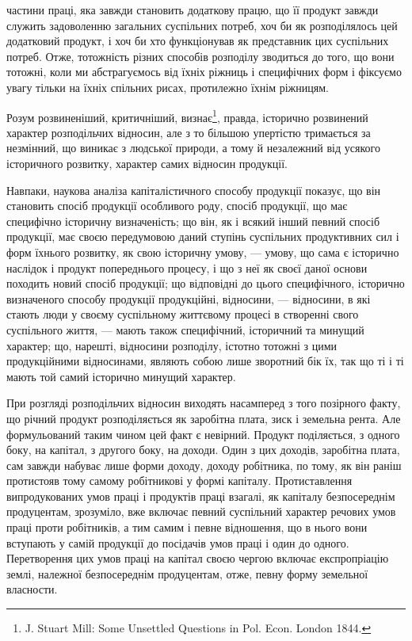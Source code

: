 \parcont{}  %
частини праці, яка завжди становить додаткову працю, що її продукт завжди
служить задоволенню загальних суспільних потреб, хоч би як розподілялось
цей додатковий продукт, і хоч би хто функціонував як представник цих суспільних
потреб. Отже, тотожність різних способів розподілу зводиться до того,
що вони тотожні, коли ми абстрагуємось від їхніх ріжниць і специфічних форм
і фіксуємо увагу тільки на їхніх спільних рисах, протилежно їхнім ріжницям.

Розум розвиненіший, критичніший, визнає\footnote{
J. Stuart Mill: Some Unsettled Questions in Pol. Econ. London 1844.
}, правда, історично розвинений
характер розподільчих відносин, але з то більшою упертістю тримається за незмінний,
що виникає з людської природи, а тому й незалежний від усякого історичного
розвитку, характер самих відносин продукції.

Навпаки, наукова аналіза капіталістичного способу продукції показує, що
він становить спосіб продукції особливого роду, спосіб продукції, що має специфічно
історичну визначеність; що він, як і всякий інший певний спосіб продукції,
має своєю передумовою даний ступінь суспільних продуктивних сил і
форм їхнього розвитку, як свою історичну умову, — умову, що сама є історично
наслідок і продукт попереднього процесу, і що з неї як своєї даної основи
походить новий спосіб продукції; що відповідні до цього специфічного, історично
визначеного способу продукції продукційні, відносини, — відносини, в які стають
люди у своєму суспільному життєвому процесі в створенні свого суспільного
життя, — мають також специфічний, історичний та минущий характер; що, нарешті,
відносини розподілу, істотно тотожні з цими продукційними відносинами,
являють собою лише зворотний бік їх, так що ті і ті мають той самий
історично минущий характер.

При розгляді розподільчих відносин виходять насамперед з того позірного
факту, що річний продукт розподіляється як заробітна плата, зиск і земельна
рента. Але формульований таким чином цей факт є невірний. Продукт поділяється,
з одного боку, на капітал, з другого боку, на доходи. Один з цих доходів,
заробітна плата, сам завжди набуває лише форми доходу, доходу робітника, по
тому, як він раніш протистояв тому самому робітникові у формі капіталу.
Протиставлення випродукованих умов праці і продуктів праці взагалі, як капіталу
безпосереднім продуцентам, зрозуміло, вже включає певний суспільний характер
речових умов праці проти робітників, а тим самим і певне відношення, що
в нього вони вступають у самій продукції до посідачів умов праці і один
до одного. Перетворення цих умов праці на капітал своєю чергою включає
експропріацію землі, належної безпосереднім продуцентам, отже, певну форму
земельної власности.

